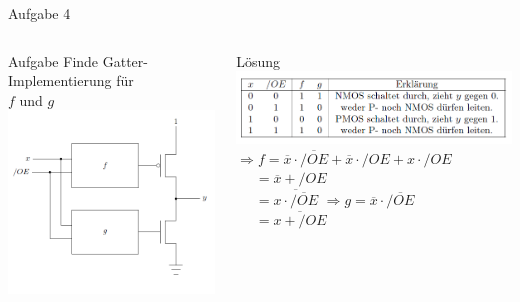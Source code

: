 \documentclass{beamer}
\begin{document}
    \begin{frame}{Aufgabe 4}{}
      \begin{columns}
        \begin{column}{0.5\textwidth}
          \begin{block}{Aufgabe}
              \scriptsize
              Finde Gatter-Implementierung für \\$f$ und $g$ \\
              \includegraphics[scale=0.35]{./figures/Tristate-Treiber.png}
          \end{block}
        \end{column}
        \begin{column}{0.5\textwidth}
          \begin{block}{Lösung}
              \includegraphics[scale=0.35]{./figures/Tristate-Treiber-Tabelle.png}\\
              \scriptsize
              $\Rightarrow f = \overline{x} \cdot \overline{/OE} + \overline{x} \cdot /OE + x \cdot /OE$ \\
              $ \ \ \ \ \ \  = \overline{x} + /OE$ \\
              $ \ \ \ \ \ \  = \overline{x \cdot \overline{ /OE}}$ \newline \newline \newline
              $\Rightarrow g = \overline{x} \cdot \overline{/OE} $ \\
              $ \ \ \ \ \ \  = \overline{x + /OE}$%
          \end{block}
        \end{column}
      \end{columns}
    \end{frame}
\end{document}
